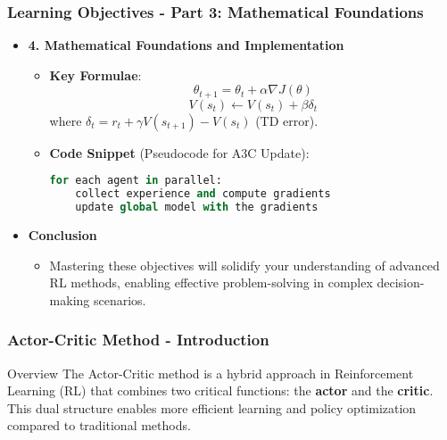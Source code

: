 \documentclass{beamer}
\begin{document}
\begin{frame}[fragile]
    \frametitle{Learning Objectives - Part 3: Mathematical Foundations}
    \begin{itemize}
        \item \textbf{4. Mathematical Foundations and Implementation}
        \begin{itemize}
            \item \textbf{Key Formulae}:
            \begin{equation}
                \theta_{t+1} = \theta_t + \alpha \nabla J(\theta)
            \end{equation}
            \begin{equation}
                V(s_t) \leftarrow V(s_t) + \beta \delta_t
            \end{equation}
            where \(\delta_t = r_t + \gamma V(s_{t+1}) - V(s_t)\) (TD error).
            
            \item \textbf{Code Snippet} (Pseudocode for A3C Update):
            \begin{lstlisting}[language=Python]
for each agent in parallel:
    collect experience and compute gradients
    update global model with the gradients
            \end{lstlisting}
        \end{itemize}
        
        \item \textbf{Conclusion}
        \begin{itemize}
            \item Mastering these objectives will solidify your understanding of advanced RL methods, enabling effective problem-solving in complex decision-making scenarios.
        \end{itemize}
    \end{itemize}
\end{frame}

\begin{frame}[fragile]
    \frametitle{Actor-Critic Method - Introduction}
    \begin{block}{Overview}
        The Actor-Critic method is a hybrid approach in Reinforcement Learning (RL) that combines two critical functions: the \textbf{actor} and the \textbf{critic}. This dual structure enables more efficient learning and policy optimization compared to traditional methods.
    \end{block}
\end{frame}
\end{document}
